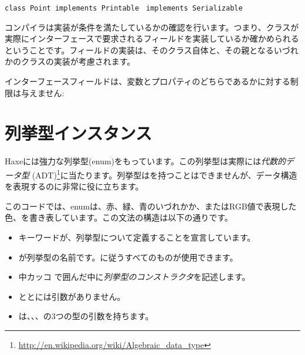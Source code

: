 \begin{lstlisting}
class Point implements Printable　implements Serializable
\end{lstlisting}

コンパイラは実装が条件を満たしているかの確認を行います。つまり、クラスが実際にインターフェースで要求されるフィールドを実装しているか確かめられるということです。フィールドの実装は、そのクラス自体と、その親となるいづれかのクラスの実装が考慮されます。

インターフェースフィールドは、変数とプロパティのどちらであるかに対する制限は与えません:




\section{列挙型インスタンス}
\label{types-enum-instance}

Haxeには強力な列挙型(enum)をもっています。この列挙型は実際には\emph{代数的データ型} (ADT)\footnote{\url{http://en.wikipedia.org/wiki/Algebraic_data_type}}に当たります。列挙型はを持つことはできませんが、データ構造を表現するのに非常に役に立ちます。


このコードでは、enumは、赤、緑、青のいづれかか、またはRGB値で表現した色、を書き表しています。この文法の構造は以下の通りです。

\begin{itemize}
	\item {}キーワードが、列挙型について定義することを宣言しています。
	\item {}が列挙型の名前です。に従うすべてのものが使用できます。
	\item 中カッコ \expr{$\left\{\right\}$} で囲んだ中に\emph{列挙型のコンストラクタ}を記述します。
	\item {}ととには引数がありません。
	\item {}は、、、の3つの型の引数を持ちます。
\end{itemize}

